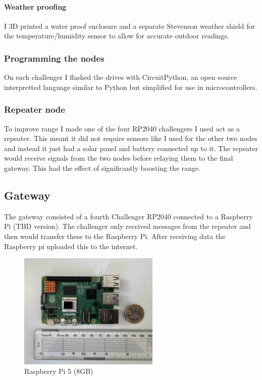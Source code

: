 \paragraph{Weather proofing}

I 3D printed a water proof enclosure and a separate Stevenson weather shield for
the temperature/humidity sensor to allow for accurate outdoor readings.

\subsubsection{Programming the nodes}

On each challenger I flashed the drives with CircuitPython, an open source
interpretted language similar to Python but simplified for use in
microcontrollers.

\subsubsection{Repeater node}

To improve range I made one of the four RP2040 challengers I used act as a
repeater. This meant it did not require sensors like I used for the other two
nodes and instead it just had a solar panel and battery connected up to it. The
repeater would receive signals from the two nodes before relaying them to the
final gateway. This had the effect of significantly boosting the range.

\subsection{Gateway}

The gateway consisted of a fourth Challenger RP2040 connected to a Raspberry Pi
(TBD version). The challenger only received messages from the repeater and
then would transfer these to the Raspberry Pi. After receiving data the
Raspberry pi uploaded this to the internet.

\begin{figure}[H]
    \centering
    \includegraphics[width=0.6\textwidth]{contents/22-hw-design/22-fig/raspberry-pi.jpg}
    \caption{Raspberry Pi 5 (8GB)}
    \label{fig:raspberry-pi}
\end{figure}

